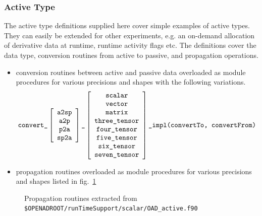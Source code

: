 \documentclass{book}
\newcommand{\reffig}[1]{{fig.~\ref{#1}}}
\begin{document}
\subsubsection{Active Type}\label{sec:activeTypeDefs}
The active type definitions supplied here cover simple examples of active types. 
They can easily be extended for other experiments, e.g. an on-demand  allocation of 
derivative data at runtime, runtime activity flags etc. 
The definitions cover the data type, conversion routines from active to passive, 
and propagation operations.
\begin{itemize}
\item conversion routines between active and passive data overloaded as module procedures for various  precisions and shapes with the following variations.
$$
\mbox{\tt convert\_}
\left[\begin{array}{c}
\mbox{\tt a2sp} \\
\mbox{\tt a2p} \\
\mbox{\tt p2a} \\
\mbox{\tt sp2a}
\end{array}\right]
\mbox{\tt \_}
\left[\begin{array}{c}
\mbox{\tt scalar} \\
\mbox{\tt vector} \\
\mbox{\tt matrix} \\
\mbox{\tt three\_tensor}\\
\mbox{\tt four\_tensor}\\
\mbox{\tt five\_tensor}\\
\mbox{\tt six\_tensor}\\
\mbox{\tt seven\_tensor}\\
\end{array}\right]
\mbox{\tt \_impl(convertTo, convertFrom)}
$$
\item propagation routines overloaded as module procedures for various precisions and shapes listed in \reffig{fig:runtimeActive}
\end{itemize} 
\begin{figure}
\begin{minipage}[t]{.48\linewidth}
\scriptsize
\end{minipage}
\hspace{.02\linewidth}
\begin{minipage}[t]{.48\linewidth}
\scriptsize
\end{minipage}
\caption{Propagation routines extracted from \lstinline{$OPENADROOT/runTimeSupport/scalar/OAD_active.f90} %
}\label{fig:runtimeActive}
\end{figure}
\end{document}
